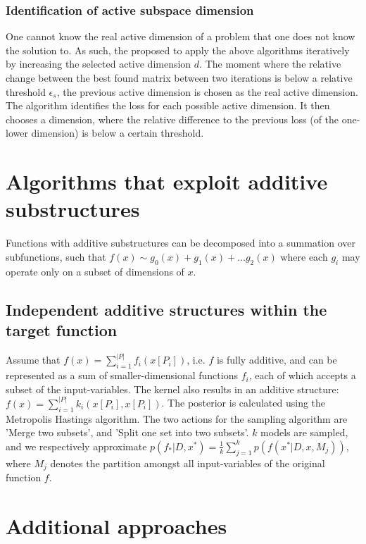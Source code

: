 \subsubsection{Identification of active subspace dimension }
One cannot know the real active dimension of a problem that one does not know the solution to.
As such, the proposed to apply the above algorithms iteratively by increasing the selected active dimension $d$.
The moment where the relative change between the best found matrix between two iterations is below a relative threshold $\epsilon_s$, the previous active dimension is chosen as the real active dimension. 
The algorithm identifies the loss for each possible active dimension.
It then chooses a dimension, where the relative difference to the previous loss (of the one-lower dimension) is below a certain threshold.

\section{Algorithms that exploit additive substructures}

Functions with additive substructures can be decomposed into a summation over subfunctions, such that
$ f(x) \sim g_0(x) + g_1(x) + \ldots g_2(x) $ where each $g_i$ may operate only on a subset of dimensions of $x$.

\subsection{Independent additive structures within the target function}

\citep{Gardner2017} Assume that $f(x) = \sum_{i=1}^{ |P| } f_i (x[P_i] )$, i.e. $f$ is fully additive, and can be represented as a sum of smaller-dimensional functions $f_i$, each of which accepts a subset of the input-variables.
The kernel also results in an additive structure: $f(x) = \sum_{i=1}^{ |P| } k_i (x[P_i], x[P_i])$.
The posterior is calculated using the Metropolis Hastings algorithm.
The two actions for the sampling algorithm are 'Merge two subsets', and 'Split one set into two subsets'.
$k$ models are sampled, and we respectively approximate $p(f_* | D, x^*) = \frac{1}{k} \sum_{j=1}^{k} p( f(x^* | D, x, M_j) )$, where $M_j$ denotes the partition amongst all input-variables of the original function $f$.

\section{Additional approaches}

